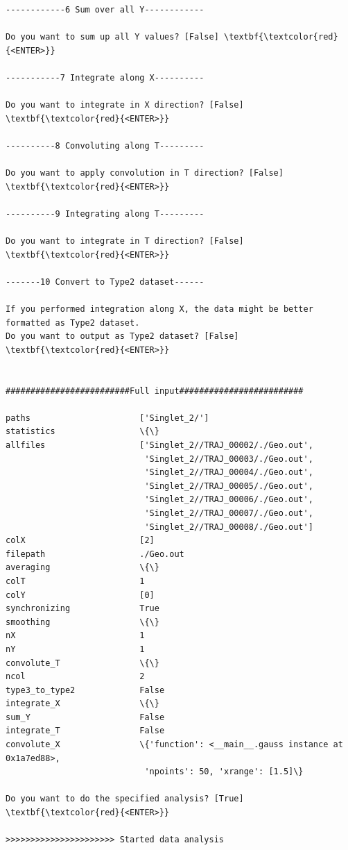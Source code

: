 \documentclass[a4paper,11pt,DIV=15,openany]{scrbook}
\begin{document}
\begin{oframed}
\begin{Verbatim}[commandchars=\\\{\}]
------------6 Sum over all Y------------

Do you want to sum up all Y values? [False] \textbf{\textcolor{red}{<ENTER>}}

-----------7 Integrate along X----------

Do you want to integrate in X direction? [False] \textbf{\textcolor{red}{<ENTER>}}

----------8 Convoluting along T---------

Do you want to apply convolution in T direction? [False] \textbf{\textcolor{red}{<ENTER>}}

----------9 Integrating along T---------

Do you want to integrate in T direction? [False] \textbf{\textcolor{red}{<ENTER>}}

-------10 Convert to Type2 dataset------

If you performed integration along X, the data might be better formatted as Type2 dataset.
Do you want to output as Type2 dataset? [False] \textbf{\textcolor{red}{<ENTER>}}


#########################Full input#########################

paths                      ['Singlet_2/']
statistics                 \{\}
allfiles                   ['Singlet_2//TRAJ_00002/./Geo.out', 
                            'Singlet_2//TRAJ_00003/./Geo.out', 
                            'Singlet_2//TRAJ_00004/./Geo.out', 
                            'Singlet_2//TRAJ_00005/./Geo.out', 
                            'Singlet_2//TRAJ_00006/./Geo.out', 
                            'Singlet_2//TRAJ_00007/./Geo.out', 
                            'Singlet_2//TRAJ_00008/./Geo.out']
colX                       [2]
filepath                   ./Geo.out
averaging                  \{\}
colT                       1
colY                       [0]
synchronizing              True
smoothing                  \{\}
nX                         1
nY                         1
convolute_T                \{\}
ncol                       2
type3_to_type2             False
integrate_X                \{\}
sum_Y                      False
integrate_T                False
convolute_X                \{'function': <__main__.gauss instance at 0x1a7ed88>, 
                            'npoints': 50, 'xrange': [1.5]\}

Do you want to do the specified analysis? [True] \textbf{\textcolor{red}{<ENTER>}}

>>>>>>>>>>>>>>>>>>>>>> Started data analysis


\end{Verbatim}
\end{oframed}
\end{document}

